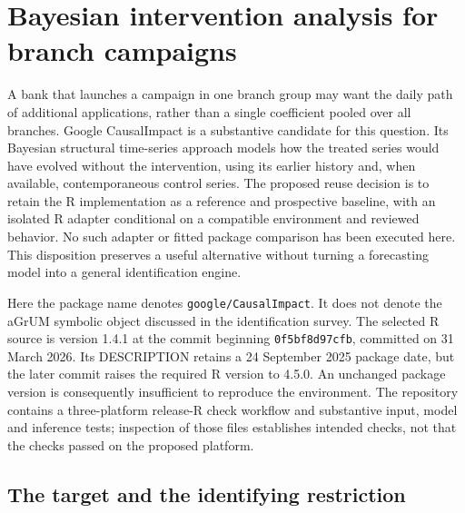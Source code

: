 \section{Bayesian intervention analysis for branch campaigns}
\label{exec13:causalimpact-reuse}

A bank that launches a campaign in one branch group may want the daily path of
additional applications, rather than a single coefficient pooled over all
branches. Google CausalImpact is a substantive candidate for this question.
Its Bayesian structural time-series approach models how the treated series
would have evolved without the intervention, using its earlier history and,
when available, contemporaneous control series. The proposed reuse decision
is to retain the R implementation as a reference and prospective baseline,
with an isolated R adapter conditional on a compatible environment and
reviewed behavior. No such adapter or fitted package comparison has been
executed here. This disposition preserves a useful alternative without
turning a forecasting model into a general identification engine.
\cite{exec13_ci_reuse,exec13_ci_r}

Here the package name denotes \texttt{google/CausalImpact}. It does not denote
the aGrUM symbolic object discussed in the identification survey. The
selected R source is version 1.4.1 at the commit beginning
\texttt{0f5bf8d97cfb}, committed on 31 March 2026. Its DESCRIPTION retains a
24 September 2025 package date, but the later commit raises the required R
version to 4.5.0. An unchanged package version is consequently insufficient
to reproduce the environment. The repository contains a three-platform
release-R check workflow and substantive input, model and inference tests;
inspection of those files establishes intended checks, not that the checks
passed on the proposed platform.\cite{exec13_ci_r,exec13_ci_semantics}

\subsection{The target and the identifying restriction}

